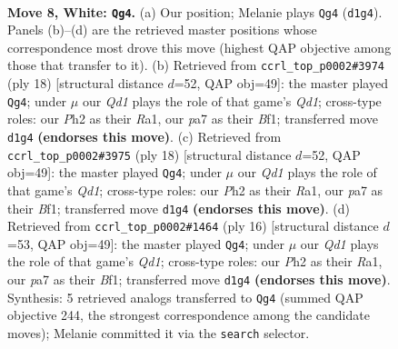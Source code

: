\documentclass[11pt]{article}
\begin{document}
\begin{figure}[p]\centering
\begin{subfigure}{0.46\textwidth}\centering
\resizebox{\linewidth}{!}{%
\newchessgame
\chessboard[
  setfen={rnb2rk1/pppnqppp/4p3/3pP3/3P1P2/2N5/PPP3PP/R2QKBNR w KQ - 1 8},
  showmover=false,
  pgfstyle=straightmove, color=movearrow, markmove={d1-g4}
]}
\caption{}
\end{subfigure}\hfill
\begin{subfigure}{0.46\textwidth}\centering
\resizebox{\linewidth}{!}{%
\newchessgame
\chessboard[
  setfen={rnb1k2r/pppnqppp/4p3/3pP3/3P4/2N3PN/PPP2P2/R2QKB1R w KQkq - 1 10},
  showmover=false,
  pgfstyle=straightmove, color=movearrow, markmove={d1-g4}
]}
\caption{}
\end{subfigure}
\\[4pt]
\begin{subfigure}{0.46\textwidth}\centering
\resizebox{\linewidth}{!}{%
\newchessgame
\chessboard[
  setfen={rnb1k2r/pppnqppp/4p3/3pP3/3P4/2N3PN/PPP2P2/R2QKB1R w KQkq - 1 10},
  showmover=false,
  pgfstyle=straightmove, color=movearrow, markmove={d1-g4}
]}
\caption{}
\end{subfigure}\hfill
\begin{subfigure}{0.46\textwidth}\centering
\resizebox{\linewidth}{!}{%
\newchessgame
\chessboard[
  setfen={rnb1k2r/pppnqppp/4p3/3pP3/3P4/2N4N/PPP2PP1/R2QKB1R w KQkq - 2 9},
  showmover=false,
  pgfstyle=straightmove, color=movearrow, markmove={d1-g4}
]}
\caption{}
\end{subfigure}
\caption{\textbf{Move 8, White: \texttt{Qg4}.} (a) Our position; Melanie plays \texttt{Qg4} (\texttt{d1g4}). Panels (b)--(d) are the retrieved master positions whose correspondence most drove this move (highest QAP objective among those that transfer to it). (b) Retrieved from \texttt{ccrl\_top\_p0002\#3974} (ply 18) [structural distance $d$=52, QAP obj=49]: the master played \texttt{Qg4}; under $\mu$ our \emph{Qd1} plays the role of that game's \emph{Qd1}; cross-type roles: our \emph{P}h2 as their \emph{R}a1, our \emph{p}a7 as their \emph{B}f1; transferred move \texttt{d1g4} \textbf{(endorses this move)}. (c) Retrieved from \texttt{ccrl\_top\_p0002\#3975} (ply 18) [structural distance $d$=52, QAP obj=49]: the master played \texttt{Qg4}; under $\mu$ our \emph{Qd1} plays the role of that game's \emph{Qd1}; cross-type roles: our \emph{P}h2 as their \emph{R}a1, our \emph{p}a7 as their \emph{B}f1; transferred move \texttt{d1g4} \textbf{(endorses this move)}. (d) Retrieved from \texttt{ccrl\_top\_p0002\#1464} (ply 16) [structural distance $d$=53, QAP obj=49]: the master played \texttt{Qg4}; under $\mu$ our \emph{Qd1} plays the role of that game's \emph{Qd1}; cross-type roles: our \emph{P}h2 as their \emph{R}a1, our \emph{p}a7 as their \emph{B}f1; transferred move \texttt{d1g4} \textbf{(endorses this move)}. Synthesis: 5 retrieved analogs transferred to \texttt{Qg4} (summed QAP objective 244, the strongest correspondence among the candidate moves); Melanie committed it via the \texttt{search} selector.}
\label{fig:thought-m14}
\end{figure}
\end{document}
